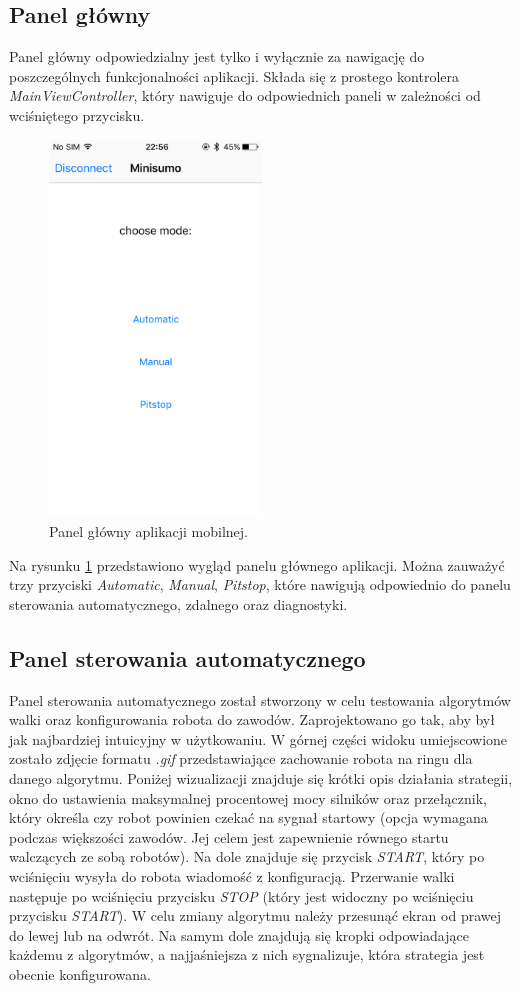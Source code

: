 \subsection{Panel główny}
Panel główny odpowiedzialny jest tylko i wyłącznie za nawigację do poszczególnych funkcjonalności aplikacji. Składa się z prostego kontrolera \textit{MainViewController}, który nawiguje do odpowiednich paneli w zależności od wciśniętego przycisku.

\begin{figure}[H]
	\centering
		\includegraphics[width=0.75\linewidth, height=10cm, keepaspectratio, fbox]{pic05/main.PNG}
	\caption{Panel główny aplikacji mobilnej.}
	\label{fig:mainview}	
\end{figure}

Na rysunku \ref{fig:mainview} przedstawiono wygląd panelu głównego aplikacji. Można zauważyć trzy przyciski \textit{Automatic}, \textit{Manual}, \textit{Pitstop}, które nawigują odpowiednio do panelu sterowania automatycznego, zdalnego oraz diagnostyki. 

\subsection{Panel sterowania automatycznego}
Panel sterowania automatycznego został stworzony w celu testowania algorytmów walki oraz konfigurowania robota do zawodów. Zaprojektowano go tak, aby był jak najbardziej intuicyjny w użytkowaniu. W górnej części widoku umiejscowione zostało zdjęcie formatu \textit{.gif} przedstawiające zachowanie robota na ringu dla danego algorytmu. Poniżej wizualizacji znajduje się krótki opis działania strategii, okno do ustawienia maksymalnej procentowej mocy silników oraz przełącznik, który określa czy robot powinien czekać na sygnał startowy (opcja wymagana podczas większości zawodów. Jej celem jest zapewnienie równego startu walczących ze sobą robotów). Na dole znajduje się przycisk \textit{START}, który po wciśnięciu wysyła do robota wiadomość z konfiguracją. Przerwanie walki następuje po wciśnięciu przycisku \textit{STOP} (który jest widoczny po wciśnięciu przycisku \textit{START}).  W celu zmiany algorytmu należy przesunąć ekran od prawej do lewej lub na odwrót. Na samym dole znajdują się kropki odpowiadające każdemu z algorytmów, a najjaśniejsza z nich sygnalizuje, która strategia jest obecnie konfigurowana.

